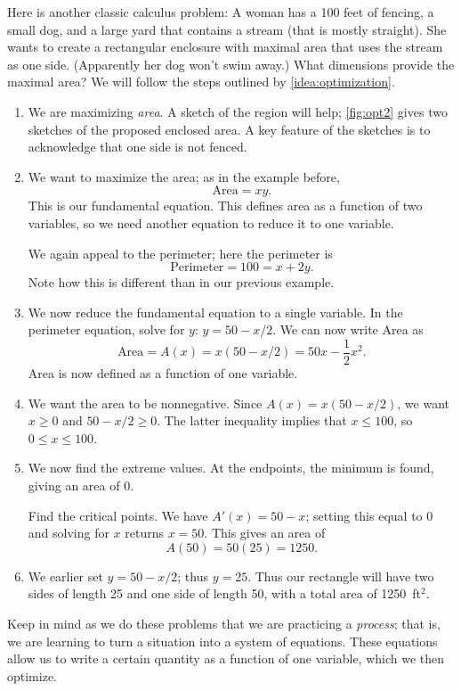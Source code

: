 \begin{example}\label{ex_opt2}
Here is another classic calculus problem: A woman has a 100 feet of fencing, a small dog, and a large yard that contains a stream (that is mostly straight). She wants to create a rectangular enclosure with maximal area that uses the stream as one side. (Apparently her dog won't swim away.) What dimensions provide the maximal area?
\solution
We will follow the steps outlined by \autoref{idea:optimization}. 
\begin{enumerate}
	\item		We are maximizing \emph{area}. A sketch of the region will help; \autoref{fig:opt2} gives two sketches of the proposed enclosed area. A key feature of the sketches is to acknowledge that one side is not fenced. 
	
	\item		We want to maximize the area; as in the example before,
	\[\text{Area} = xy.\]
	This is our fundamental equation. This defines area as a function of two variables, so we need another equation to  reduce it to one variable.
	
	We again appeal to the perimeter; here the perimeter is
	\[\text{Perimeter} = 100 = x+2y.\]
	Note how this is different than in our previous example.
	\item		We now reduce the fundamental equation to a single variable. In the perimeter equation, solve for $y$: $y = 50 - x/2$. We can now write Area as
	\[\text{Area} = A(x) = x(50-x/2) = 50x - \frac12x^2.\]
	Area is now defined as a function of one variable.
	\item		We want the area to be nonnegative. Since $A(x) = x(50-x/2)$, we want $x\geq 0$ and $50-x/2\geq 0$. The latter inequality implies that $x\leq100$, so $0\leq x\leq 100$. 
	\item		We now find the extreme values. At the endpoints, the minimum is found, giving an area of 0. 
	
	Find the critical points. We have $A'(x) = 50-x$; setting this equal to 0 and solving for $x$ returns $x=50$. This gives an area of
	\[A(50) = 50(25) = 1250.\]
	\item		We earlier set $y = 50-x/2$; thus $y = 25$. Thus our rectangle will have two sides of length 25 and one side of length 50, with a total area of 1250~ft$^2$.
\end{enumerate}
\end{example}

Keep in mind as we do these problems that we are practicing a \emph{process}; that is, we are learning to turn a situation into a system of equations. These equations allow us to write a certain quantity as a function of one variable, which we then optimize.


